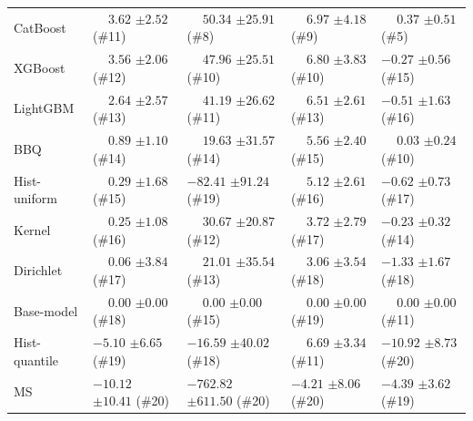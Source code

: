 \begin{tabular}{lllll}
CatBoost & $\phantom{-}3.62$ {\tiny $\pm 2.52$} (\#11) & $\phantom{-}50.34$ {\tiny $\pm 25.91$} (\#8) & $\phantom{-}6.97$ {\tiny $\pm 4.18$} (\#9) & $\phantom{-}0.37$ {\tiny $\pm 0.51$} (\#5) \\
XGBoost & $\phantom{-}3.56$ {\tiny $\pm 2.06$} (\#12) & $\phantom{-}47.96$ {\tiny $\pm 25.51$} (\#10) & $\phantom{-}6.80$ {\tiny $\pm 3.83$} (\#10) & $-0.27$ {\tiny $\pm 0.56$} (\#15) \\
LightGBM & $\phantom{-}2.64$ {\tiny $\pm 2.57$} (\#13) & $\phantom{-}41.19$ {\tiny $\pm 26.62$} (\#11) & $\phantom{-}6.51$ {\tiny $\pm 2.61$} (\#13) & $-0.51$ {\tiny $\pm 1.63$} (\#16) \\
BBQ & $\phantom{-}0.89$ {\tiny $\pm 1.10$} (\#14) & $\phantom{-}19.63$ {\tiny $\pm 31.57$} (\#14) & $\phantom{-}5.56$ {\tiny $\pm 2.40$} (\#15) & $\phantom{-}0.03$ {\tiny $\pm 0.24$} (\#10) \\
Hist-uniform & $\phantom{-}0.29$ {\tiny $\pm 1.68$} (\#15) & $-82.41$ {\tiny $\pm 91.24$} (\#19) & $\phantom{-}5.12$ {\tiny $\pm 2.61$} (\#16) & $-0.62$ {\tiny $\pm 0.73$} (\#17) \\
Kernel & $\phantom{-}0.25$ {\tiny $\pm 1.08$} (\#16) & $\phantom{-}30.67$ {\tiny $\pm 20.87$} (\#12) & $\phantom{-}3.72$ {\tiny $\pm 2.79$} (\#17) & $-0.23$ {\tiny $\pm 0.32$} (\#14) \\
Dirichlet & $\phantom{-}0.06$ {\tiny $\pm 3.84$} (\#17) & $\phantom{-}21.01$ {\tiny $\pm 35.54$} (\#13) & $\phantom{-}3.06$ {\tiny $\pm 3.54$} (\#18) & $-1.33$ {\tiny $\pm 1.67$} (\#18) \\
Base-model & $\phantom{-}0.00$ {\tiny $\pm 0.00$} (\#18) & $\phantom{-}0.00$ {\tiny $\pm 0.00$} (\#15) & $\phantom{-}0.00$ {\tiny $\pm 0.00$} (\#19) & $\phantom{-}0.00$ {\tiny $\pm 0.00$} (\#11) \\
Hist-quantile & $-5.10$ {\tiny $\pm 6.65$} (\#19) & $-16.59$ {\tiny $\pm 40.02$} (\#18) & $\phantom{-}6.69$ {\tiny $\pm 3.34$} (\#11) & $-10.92$ {\tiny $\pm 8.73$} (\#20) \\
MS & $-10.12$ {\tiny $\pm 10.41$} (\#20) & $-762.82$ {\tiny $\pm 611.50$} (\#20) & $-4.21$ {\tiny $\pm 8.06$} (\#20) & $-4.39$ {\tiny $\pm 3.62$} (\#19) \\
\bottomrule
\end{tabular}
